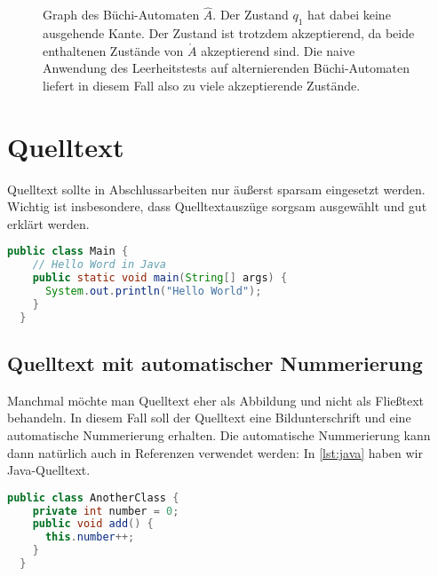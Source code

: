 \begin{figure}
  \centering
  \caption[Graph des Büchi-Automaten $\hat A$.]{Graph des Büchi-Automaten $\hat A$. Der Zustand $q_1$ hat dabei keine ausgehende Kante. Der Zustand ist trotzdem akzeptierend, da beide enthaltenen Zustände von $\acute A$ akzeptierend sind. Die naive Anwendung des Leerheitstests auf alternierenden Büchi-Automaten liefert in diesem Fall also zu viele akzeptierende Zustände.}
  \label{fig:buechi}
\end{figure}

\section{Quelltext}

Quelltext sollte in Abschlussarbeiten nur äußerst sparsam eingesetzt werden. Wichtig ist insbesondere, dass Quelltextauszüge sorgsam ausgewählt und gut erklärt werden.

\begin{lstlisting}[language=Java,gobble=2]
  public class Main {
    // Hello Word in Java
    public static void main(String[] args) {
      System.out.println("Hello World");
    }
  }
\end{lstlisting}

\subsection{Quelltext mit automatischer Nummerierung}

Manchmal möchte man Quelltext eher als Abbildung und nicht als Fließtext behandeln. In diesem Fall soll der Quelltext eine Bildunterschrift und eine automatische Nummerierung erhalten. Die automatische Nummerierung kann dann natürlich auch in Referenzen verwendet werden: In \vref{lst:java} haben wir Java-Quelltext.

\begin{lstlisting}[language=Java,gobble=2,caption={Ich bin die Bildunterschrift des Quelltextes},label=lst:java]
  public class AnotherClass {
    private int number = 0;
    public void add() {
      this.number++;
    }
  }
\end{lstlisting}

